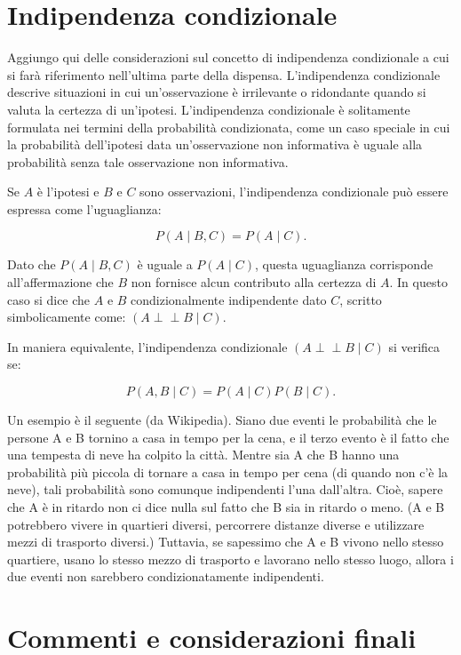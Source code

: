 \documentclass[
  11pt,
]{krantz}
\theoremstyle{definition}
\theoremstyle{definition}
\theoremstyle{definition}
\theoremstyle{definition}
\theoremstyle{remark}
\begin{document}
\hypertarget{indipendenza-condizionale}{%
\section{Indipendenza condizionale}\label{indipendenza-condizionale}}

Aggiungo qui delle considerazioni sul concetto di indipendenza condizionale a cui si farà riferimento nell'ultima parte della dispensa. L'indipendenza condizionale descrive situazioni in cui un'osservazione è irrilevante o ridondante quando si valuta la certezza di un'ipotesi. L'indipendenza condizionale è solitamente formulata nei termini della probabilità condizionata, come un caso speciale in cui la probabilità dell'ipotesi data un'osservazione non informativa è uguale alla probabilità senza tale osservazione non informativa.

Se \(A\) è l'ipotesi e \(B\) e \(C\) sono osservazioni, l'indipendenza condizionale può essere espressa come l'uguaglianza:

\[
P(A \mid B,C)=P(A \mid C).
\]

Dato che \(P(A \mid B,C)\) è uguale a \(P(A \mid C)\), questa uguaglianza corrisponde all'affermazione che \(B\) non fornisce alcun contributo alla certezza di \(A\). In questo caso si dice che \(A\) e \(B\) condizionalmente indipendente dato \(C\), scritto simbolicamente come: \((A \perp\!\!\!\!\perp B \mid C)\).

In maniera equivalente, l'indipendenza condizionale \((A \perp\!\!\!\!\perp B \mid C)\) si verifica se:

\[
P(A, B \mid C) = P(A \mid C) P(B \mid C).
\]

Un esempio è il seguente (da Wikipedia). Siano due eventi le probabilità che le persone A e B tornino a casa in tempo per la cena, e il terzo evento è il fatto che una tempesta di neve ha colpito la città. Mentre sia A che B hanno una probabilità più piccola di tornare a casa in tempo per cena (di quando non c'è la neve), tali probabilità sono comunque indipendenti l'una dall'altra. Cioè, sapere che A è in ritardo non ci dice nulla sul fatto che B sia in ritardo o meno. (A e B potrebbero vivere in quartieri diversi, percorrere distanze diverse e utilizzare mezzi di trasporto diversi.) Tuttavia, se sapessimo che A e B vivono nello stesso quartiere, usano lo stesso mezzo di trasporto e lavorano nello stesso luogo, allora i due eventi non sarebbero condizionatamente indipendenti.

\hypertarget{commenti-e-considerazioni-finali-1}{%
\section*{Commenti e considerazioni finali}\label{commenti-e-considerazioni-finali-1}}
\end{document}
